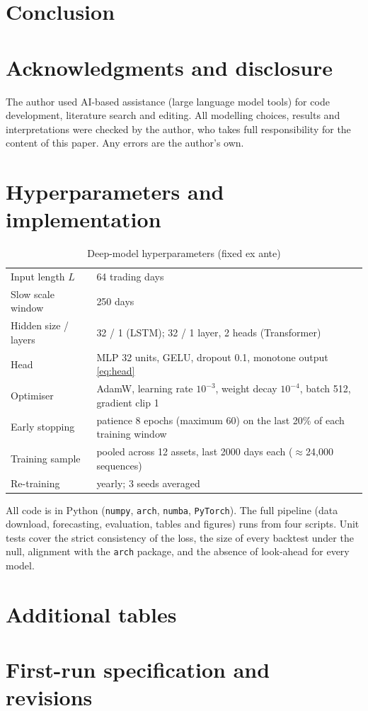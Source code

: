 \documentclass[11pt]{article}
\theoremstyle{remark}
\newcommand{\1}{\mathbf{1}}
\begin{document}
\section{Conclusion}\label{sec:conclusion}


\section*{Acknowledgments and disclosure}
The author used AI-based assistance (large language model tools) for code development, literature search and editing. All modelling choices, results and interpretations were checked by the author, who takes full responsibility for the content of this paper. Any errors are the author's own.




\appendix
\section{Hyperparameters and implementation}\label{app:hyper}
\begin{table}[htbp]\centering\footnotesize
\caption{Deep-model hyperparameters (fixed ex ante)}
\begin{tabular}{ll}\toprule
Input length $L$ & 64 trading days \\
Slow scale window & 250 days \\
Hidden size / layers & 32 / 1 (LSTM); 32 / 1 layer, 2 heads (Transformer) \\
Head & MLP 32 units, GELU, dropout 0.1, monotone output \eqref{eq:head} \\
Optimiser & AdamW, learning rate $10^{-3}$, weight decay $10^{-4}$, batch 512, gradient clip 1 \\
Early stopping & patience 8 epochs (maximum 60) on the last 20\% of each training window \\
Training sample & pooled across 12 assets, last 2000 days each ($\approx$24{,}000 sequences) \\
Re-training & yearly; 3 seeds averaged \\
\bottomrule\end{tabular}
\end{table}
All code is in Python (\texttt{numpy}, \texttt{arch}, \texttt{numba}, \texttt{PyTorch}). The full pipeline (data download, forecasting, evaluation, tables and figures) runs from four scripts. Unit tests cover the strict consistency of the loss, the size of every backtest under the null, alignment with the \texttt{arch} package, and the absence of look-ahead for every model.

\section{Additional tables}


\section{First-run specification and revisions}\label{app:v1}

\end{document}
